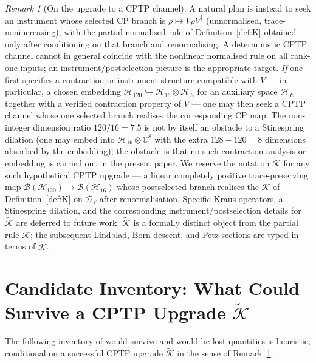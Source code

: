 \documentclass[12pt]{article}
\theoremstyle{definition}
\theoremstyle{remark}
\newtheorem{remark}[theorem]{Remark}
\newcommand{\Hcal}{\mathcal{H}}
\newcommand{\Kcal}{\mathcal{K}}
\newcommand{\Dcal}{\mathcal{D}}
\begin{document}
\begin{remark}[On the upgrade to a CPTP channel]\label{rem:K-upgrade}
A natural plan is instead to seek an instrument whose selected CP branch is $\rho \mapsto V \rho V^\dagger$ (unnormalised, trace-nonincreasing), with the partial normalised rule of Definition~\ref{def:K} obtained only after conditioning on that branch and renormalising. A deterministic CPTP channel cannot in general coincide with the nonlinear normalised rule on all rank-one inputs; an instrument/postselection picture is the appropriate target. \emph{If} one first specifies a contraction or instrument structure compatible with $V$ --- in particular, a chosen embedding $\Hcal_{120} \hookrightarrow \Hcal_{16} \otimes \Hcal_E$ for an auxiliary space $\Hcal_E$ together with a verified contraction property of $V$ --- one may then seek a CPTP channel whose one selected branch realises the corresponding CP map. The non-integer dimension ratio $120/16 = 7.5$ is not by itself an obstacle to a Stinespring dilation (one may embed into $\Hcal_{16} \otimes \mathbb{C}^8$ with the extra $128 - 120 = 8$ dimensions absorbed by the embedding); the obstacle is that no such contraction analysis or embedding is carried out in the present paper. We reserve the notation $\widetilde{\Kcal}$ for any such hypothetical CPTP upgrade --- a linear completely positive trace-preserving map $\mathcal{B}(\Hcal_{120}) \to \mathcal{B}(\Hcal_{16})$ whose postselected branch realises the $\Kcal$ of Definition~\ref{def:K} on $\Dcal_V$ after renormalisation. Specific Kraus operators, a Stinespring dilation, and the corresponding instrument/postselection details for $\widetilde{\Kcal}$ are deferred to future work. $\widetilde{\Kcal}$ is a formally distinct object from the partial rule $\Kcal$; the subsequent Lindblad, Born-descent, and Petz sections are typed in terms of $\widetilde{\Kcal}$.
\end{remark}

\section{Candidate Inventory: What Could Survive a CPTP Upgrade $\widetilde{\Kcal}$}\label{sec:invariants}

The following inventory of would-survive and would-be-lost quantities is heuristic, conditional on a successful CPTP upgrade $\widetilde{\Kcal}$ in the sense of Remark~\ref{rem:K-upgrade}.
\end{document}
